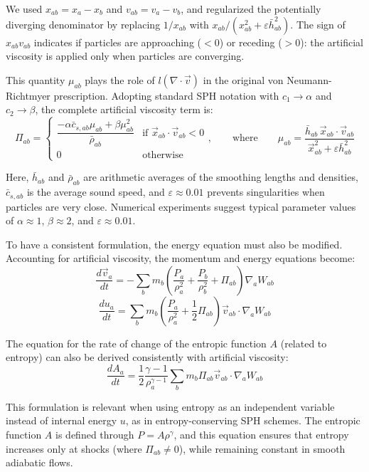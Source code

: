 We used $x_{ab} = x_a - x_b$ and $v_{ab} = v_a - v_b$, and regularized the potentially diverging denominator by replacing $1/x_{ab}$ with $x_{ab}/(x_{ab}^2 + \varepsilon \bar{h}_{ab}^2)$. The sign of $x_{ab} v_{ab}$ indicates if particles are approaching ($< 0$) or receding ($> 0$): the artificial viscosity is applied only when particles are converging.

This quantity $\mu_{ab}$ plays the role of $l(\nabla \cdot \vec{v})$ in the original von Neumann-Richtmyer prescription. Adopting standard SPH notation with $c_1 \rightarrow \alpha$ and $c_2 \rightarrow \beta$, the complete artificial viscosity term is:
$$
\Pi_{ab} = \begin{cases}
\dfrac{-\alpha \bar{c}_{s,ab} \mu_{ab} + \beta \mu_{ab}^2}{\bar{\rho}_{ab}} & \text{if } \vec{x}_{ab} \cdot \vec{v}_{ab} < 0 \\[0.5em]
0 & \text{otherwise}
\end{cases}
, \qquad \text{where} \qquad
\mu_{ab} = \dfrac{\bar{h}_{ab} \, \vec{x}_{ab} \cdot \vec{v}_{ab}}{\vec{x}_{ab}^2 + \varepsilon \bar{h}_{ab}^2}
$$

Here, $\bar{h}_{ab}$ and $\bar{\rho}_{ab}$ are arithmetic averages of the smoothing lengths and densities, $\bar{c}_{s,ab}$ is the average sound speed, and $\varepsilon \approx 0.01$ prevents singularities when particles are very close. Numerical experiments suggest typical parameter values of $\alpha \approx 1$, $\beta \approx 2$, and $\varepsilon \approx 0.01$.

To have a consistent formulation, the energy equation must also be modified. Accounting for artificial viscosity, the momentum and energy equations become:
$$
\dfrac{d\vec{v}_a}{dt} = -\sum_b m_b \left( \dfrac{P_a}{\rho_a^2} + \dfrac{P_b}{\rho_b^2} + \Pi_{ab} \right) \nabla_a W_{ab}
$$
$$
\dfrac{du_a}{dt} = \sum_b m_b \left(\dfrac{P_a}{\rho_a^2} + \frac{1}{2} \Pi_{ab} \right) \vec{v}_{ab} \cdot \nabla_a W_{ab} 
$$

The equation for the rate of change of the entropic function $A$ (related to entropy) can also be derived consistently with artificial viscosity:
$$
\dfrac{dA_a}{dt} = \dfrac{1}{2} \dfrac{\gamma - 1}{\rho_a^{\gamma - 1}} \sum_b m_b \Pi_{ab} \vec{v}_{ab} \cdot \nabla_a W_{ab}
$$

This formulation is relevant when using entropy as an independent variable instead of internal energy $u$, as in entropy-conserving SPH schemes. The entropic function $A$ is defined through $P = A \rho^\gamma$, and this equation ensures that entropy increases only at shocks (where $\Pi_{ab} \neq 0$), while remaining constant in smooth adiabatic flows.

